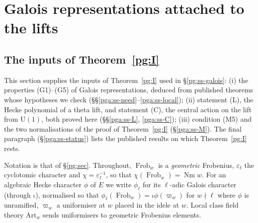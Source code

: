 \documentclass[10pt]{amsart}
\theoremstyle{definition}
\theoremstyle{remark}
\newcommand{\Q}{\mathbb Q}
\begin{document}
\section{Galois representations attached to the lifts}\label{C3:g5}
\providecommand{\auO}{\mathcal O}
\providecommand{\auQlb}{\overline{\Q}_\ell}
\providecommand{\auG}{\overline G}
\providecommand{\auNm}{\operatorname{Nm}}
\providecommand{\auU}{\mathrm U}
\providecommand{\auGL}{\mathrm{GL}}
\providecommand{\auA}{\mathbb A}
\providecommand{\auF}{\mathbb F}
\providecommand{\aubar}[1]{\overline{#1}}
\providecommand{\auf}[1]{\texttt{#1}}
\providecommand{\pgG}{G_E}
\providecommand{\pgtr}{\operatorname{tr}}
\providecommand{\pgFrob}{\operatorname{Frob}}
\providecommand{\pgcyc}{\varepsilon_\ell}
\providecommand{\pgNch}{N_{\mathrm{ch}}}
\providecommand{\pgarec}{\operatorname{rec}}
\providecommand{\pgaWD}{\operatorname{WD}}
\providecommand{\pgaInd}{\operatorname{Ind}}
\providecommand{\pgaHT}{\operatorname{HT}}
\providecommand{\pgaord}{\operatorname{ord}}

\subsection{The inputs of Theorem~\ref{pg:I}}\label{pga:sec}

This section supplies the inputs of Theorem~\ref{pg:I} used in \S\ref{pg:ss-galois}:
(i) the properties (G1)--(G5) of Galois representations, deduced from published theorems whose
hypotheses we check (\S\S\ref{pga:ss-need}--\ref{pga:ss-local}); (ii) statement (L), the Hecke
polynomial of a theta lift, and statement (C), the central action on the lift from $\auU(1)$,
both proved here (\S\S\ref{pga:ss-L}, \ref{pga:ss-C}); (iii) condition (M5) and the two
normalisations of the proof of Theorem~\ref{pg:I} (\S\ref{pga:ss-M}). The final paragraph
(\S\ref{pga:ss-status}) lists the published results on which Theorem~\ref{pg:I} rests.

Notation is that of \S\ref{pg:sec}. Throughout, $\pgFrob_w$ is a \emph{geometric} Frobenius,
$\pgcyc$ the cyclotomic character and $\chi=\pgcyc^{-1}$, so that $\chi(\pgFrob_w)=\auNm w$. For an
algebraic Hecke character $\phi$ of $E$ we write $\phi_\ell$ for its $\ell$-adic Galois character
(through $\iota$), normalised so that $\phi_\ell(\pgFrob_w)=\iota\phi(\varpi_w)$ for $w\nmid\ell$
where $\phi$ is unramified, $\varpi_w$ a uniformiser at $w$ placed in the idele at $w$. Local
class field theory $\mathrm{Art}_w$ sends uniformisers to geometric Frobenius elements.
\end{document}
